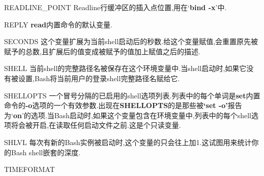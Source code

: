 \documentclass[draft,openany]{book}
\begin{document}
\begin{CJK}{UTF8}{gbsn}
\begin{basedescript}{\desclabelstyle{\nextlinelabel}\desclabelwidth{2.5em}}
    \item[READLINE\_POINT] Readline行缓冲区的插入点位置,用在`\textbf{bind -x}'中.
    \item[REPLY] \textbf{read}内置命令的默认变量.
    \item[SECONDS] 这个变量扩展为当前shell启动后的秒数.给这个变量赋值,会重置原先被赋予的总数,且扩展后的值变成被赋予的值加上赋值之后的描述.
    \item[SHELL] 当前shell的完整路径名被保存在这个环境变量中.当shell启动时,如果它没有被设置,Bash将当前用户的登录shell完整路径名赋给它.
    \item[SHELLOPTS] 一个冒号分隔的已启用的shell选项列表.列表中的每个单词是\textbf{set}内置命令的\textbf{-o}选项的一个有效参数.出现在\textbf{SHELLOPTS}的是那些被\textbf{`set -o'}报告为`\textbf{on}'的选项.当Bash启动时,如果这个变量包含在环境变量中,列表中的每个shell选项将会被开启,在读取任何启动文件之前.这是个只读变量.
    \item[SHLVL] 每次有新的Bash实例被启动时,这个变量的只会往上加1.这试图用来统计你的Bash shell嵌套的深度.
    \item[TIMEFORMAT]
    \end{basedescript}

    \newpage
\end{CJK}
\end{document}
